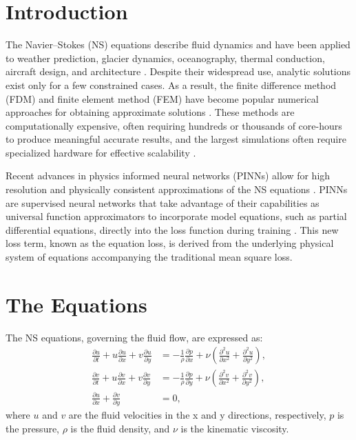 \section{Introduction}
The Navier–Stokes (NS) equations describe fluid dynamics and have been applied to weather prediction, glacier dynamics, oceanography, thermal conduction, aircraft design, and architecture \cite{chorin1968numerical}. Despite their widespread use, analytic solutions exist only for a few constrained cases. As a result, the finite difference method (FDM) and finite element method (FEM) have become popular numerical approaches for obtaining approximate solutions \cite{Whiteley2017}. These methods are computationally expensive, often requiring hundreds or thousands of core-hours to produce meaningful accurate results, and the largest simulations often require specialized hardware for effective scalability \cite{michalakes2007wrf}. 



Recent advances in physics informed neural networks (PINNs) allow for high resolution and physically consistent approximations of the NS equations \cite{jin2021nsfnets} \cite{baymani2015artificial} \cite{eivazi2022physics}. PINNs are supervised neural networks that take advantage of their capabilities as universal function approximators to incorporate model equations, such as partial differential equations, directly into the loss function during training \cite{Raissi2019}. This new loss term, known as the equation loss, is derived from the underlying physical system of equations accompanying the traditional mean square loss.

\section{The Equations}
The NS equations, governing the fluid flow, are expressed as:
\begin{align}
    \frac{\partial u}{\partial t} + u \frac{\partial u}{\partial x} + v \frac{\partial u}{\partial y} &= -\frac{1}{\rho} \frac{\partial p}{\partial x} + \nu \left( \frac{\partial^2 u}{\partial x^2} + \frac{\partial^2 u}{\partial y^2} \right), \\
    \frac{\partial v}{\partial t} + u \frac{\partial v}{\partial x} + v \frac{\partial v}{\partial y} &= -\frac{1}{\rho} \frac{\partial p}{\partial y} + \nu \left( \frac{\partial^2 v}{\partial x^2} + \frac{\partial^2 v}{\partial y^2} \right), \\
    \frac{\partial u}{\partial x} + \frac{\partial v}{\partial y} &= 0,
\end{align}
where \( u \) and \( v \) are the fluid velocities in the x and y directions, respectively, \( p \) is the pressure, \( \rho \) is the fluid density, and \( \nu \) is the kinematic viscosity.

